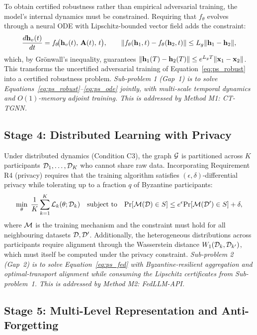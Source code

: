 To obtain certified robustness rather than empirical adversarial training, the model's internal dynamics must be constrained. Requiring that $f_\theta$ evolves through a neural ODE with Lipschitz-bounded vector field adds the constraint:
\begin{equation}
\frac{d\mathbf{h}_v(t)}{dt} = f_\theta\!\bigl(\mathbf{h}_v(t),\,\mathbf{A}(t),\,t\bigr),
\qquad
\|f_\theta(\mathbf{h}_1,t)-f_\theta(\mathbf{h}_2,t)\| \le L_g\|\mathbf{h}_1-\mathbf{h}_2\|,
\label{eq:ps_ode}
\end{equation}
which, by Gr\"{o}nwall's inequality, guarantees $\|\mathbf{h}_1(T)-\mathbf{h}_2(T)\|\le e^{L_gT}\|\mathbf{x}_1-\mathbf{x}_2\|$. This transforms the uncertified adversarial training of Equation~\eqref{eq:ps_robust} into a certified robustness problem. \emph{Sub-problem 1 (Gap~1) is to solve Equations~\eqref{eq:ps_robust}--\eqref{eq:ps_ode} jointly, with multi-scale temporal dynamics and $O(1)$-memory adjoint training. This is addressed by Method M1: CT-TGNN.}


\subsection{Stage 4: Distributed Learning with Privacy}

Under distributed dynamics (Condition C3), the graph $\mathcal{G}$ is partitioned across $K$ participants $\mathcal{D}_1,\ldots,\mathcal{D}_K$ who cannot share raw data. Incorporating Requirement R4 (privacy) requires that the training algorithm satisfies $(\epsilon,\delta)$-differential privacy while tolerating up to a fraction $q$ of Byzantine participants:
\begin{equation}
\min_\theta\;
\frac{1}{K}\sum_{k=1}^{K}\mathcal{L}_k(\theta;\mathcal{D}_k)
\quad\text{subject to}\quad
\mathrm{Pr}[\mathcal{M}(\mathcal{D})\in S] \le e^{\epsilon}\mathrm{Pr}[\mathcal{M}(\mathcal{D}')\in S]+\delta,
\label{eq:ps_fed}
\end{equation}
where $\mathcal{M}$ is the training mechanism and the constraint must hold for all neighbouring datasets $\mathcal{D},\mathcal{D}'$. Additionally, the heterogeneous distributions across participants require alignment through the Wasserstein distance $W_1(\mathcal{D}_k,\mathcal{D}_{k'})$, which must itself be computed under the privacy constraint. \emph{Sub-problem 2 (Gap~2) is to solve Equation~\eqref{eq:ps_fed} with Byzantine-resilient aggregation and optimal-transport alignment while consuming the Lipschitz certificates from Sub-problem~1. This is addressed by Method M2: FedLLM-API.}


\subsection{Stage 5: Multi-Level Representation and Anti-Forgetting}


